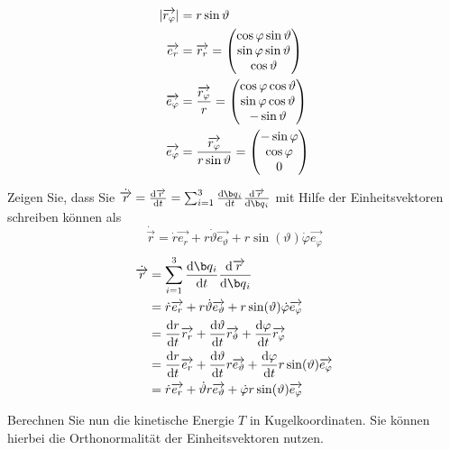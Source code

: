 \begin{enumeralph}
\begin{enumeroman}
\begin{align*}
		|\overrightarrow{r_\varphi}|&=r\sin\vartheta\\
		\overrightarrow{e_r}&=\overrightarrow{r_r}=\begin{pmatrix}\cos\varphi\sin\vartheta\\\sin\varphi\sin\vartheta\\\cos\vartheta\end{pmatrix}\\
		\overrightarrow{e_\varphi}&=\frac{\overrightarrow{r_\varphi}}{r} = \begin{pmatrix}\cos\varphi\cos\vartheta\\\sin\varphi\cos\vartheta\\-\sin\vartheta\end{pmatrix}\\
		\overrightarrow{e_\varphi}&=\frac{\overrightarrow{r_\varphi}}{r\sin\vartheta}=\begin{pmatrix}-\sin\varphi\\\cos\varphi\\0\end{pmatrix}\\
		\end{align*}
		\item Zeigen Sie, dass Sie $\dot{\overrightarrow{r}}=\frac{\mathrm{d}\overrightarrow{r}}{\mathrm{d}t}=\sum_{i=1}^{3}\frac{\mathrm{d}\q_i}{\mathrm{d}t}\frac{\mathrm{d}\overrightarrow{r}}{\mathrm{d}\q_i}$ mit Hilfe der Einheitsvektoren schreiben können als 
	\[\dot{\overrightarrow{r}}=\dot{r}\overrightarrow{e_r}+r\dot{\vartheta}\overrightarrow{e_\vartheta}+r\sin(\vartheta)\dot{\varphi}\overrightarrow{e_\varphi}\]
	\begin{align*}
	\dot{\overrightarrow{r}}&=\sum_{i=1}^{3}\frac{\mathrm{d}\q_i}{\mathrm{d}t}\frac{\mathrm{d}\overrightarrow{r}}{\mathrm{d}\q_i}\\
	&=\dot{r}\overrightarrow{e_r}+r\dot{\vartheta}\overrightarrow{e_\vartheta}+r\sin(\vartheta)\dot{\varphi}\overrightarrow{e_\varphi}\\
	&=\frac{\mathrm{d}r}{\mathrm{d}t}\overrightarrow{r_r}+\frac{\mathrm{d}\vartheta}{\mathrm{d}t}\overrightarrow{r_\vartheta}+\frac{\mathrm{d}\varphi}{\mathrm{d}t}\overrightarrow{r_\varphi}\\
	&=\frac{\mathrm{d}r}{\mathrm{d}t}\overrightarrow{e_r}+\frac{\mathrm{d}\vartheta}{\mathrm{d}t}r\overrightarrow{e_\vartheta}+\frac{\mathrm{d}\varphi}{\mathrm{d}t}r\sin(\vartheta)\overrightarrow{e_\varphi}\\
	&=\dot{r}\overrightarrow{e_r}+\dot{\vartheta}r\overrightarrow{e_\vartheta}+\dot{\varphi}r\sin(\vartheta)\overrightarrow{e_\varphi}\\
	\end{align*}
	\item Berechnen Sie nun die kinetische Energie $T$ in Kugelkoordinaten. Sie können hierbei die Orthonormalität der Einheitsvektoren nutzen.

\end{enumeroman}
\end{enumeralph}
